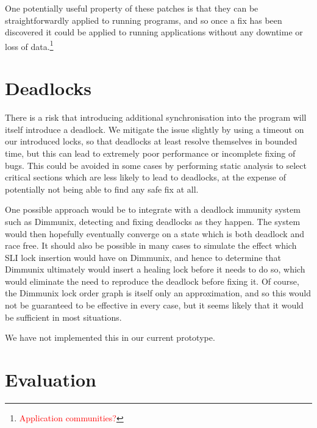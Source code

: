\documentclass[10pt,twocolumn,preprint,natbib,authoryear]{sigplanconf}
\newcommand{\editorial}[1]{\textcolor{red}{\footnote{\textcolor{red}{#1}}}}
\begin{document}
One potentially useful property of these patches is that they can be
straightforwardly applied to running programs, and so once a fix has
been discovered it could be applied to running applications without
any downtime or loss of data.\editorial{Application communities?}

\section{Deadlocks}
\label{sect:deadlocks}

There is a risk that introducing additional synchronisation into the
program will itself introduce a deadlock.  We mitigate the issue
slightly by using a timeout on our introduced locks, so that deadlocks
at least resolve themselves in bounded time, but this can lead to
extremely poor performance or incomplete fixing of bugs.  This could
be avoided in some cases by performing static analysis to select
critical sections which are less likely to lead to deadlocks, at the
expense of potentially not being able to find any safe fix at all.

One possible approach would be to integrate with a deadlock immunity
system such as Dimmunix\cite{Jula2008}, detecting and fixing deadlocks
as they happen.  The system would then hopefully eventually converge
on a state which is both deadlock and race free.  It should also be
possible in many cases to simulate the effect which SLI lock insertion
would have on Dimmunix, and hence to determine that Dimmunix
ultimately would insert a healing lock before it needs to do so, which
would eliminate the need to reproduce the deadlock before fixing it.
Of course, the Dimmunix lock order graph is itself only an
approximation, and so this would not be guaranteed to be effective in
every case, but it seems likely that it would be sufficient in most
situations.

We have not implemented this in our current prototype.

\section{Evaluation}
\end{document}
